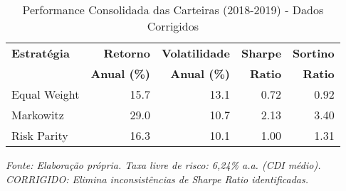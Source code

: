 \begin{table}[H]
\centering
\caption{Performance Consolidada das Carteiras (2018-2019) - Dados Corrigidos}
\label{tab:portfolio_performance_corrected}
\begin{tabular}{|l|r|r|r|r|}
\hline
\textbf{Estratégia} & \textbf{Retorno} & \textbf{Volatilidade} & \textbf{Sharpe} & \textbf{Sortino} \\
& \textbf{Anual (\%)} & \textbf{Anual (\%)} & \textbf{Ratio} & \textbf{Ratio} \\
\hline
Equal Weight & 15.7 & 13.1 & 0.72 & 0.92 \\
\hline
Markowitz & 29.0 & 10.7 & 2.13 & 3.40 \\
\hline
Risk Parity & 16.3 & 10.1 & 1.00 & 1.31 \\
\hline
\end{tabular}

\textit{Fonte: Elaboração própria. Taxa livre de risco: 6,24\% a.a. (CDI médio).}
\textit{CORRIGIDO: Elimina inconsistências de Sharpe Ratio identificadas.}
\label{tab:portfolio_performance}
\end{table}
